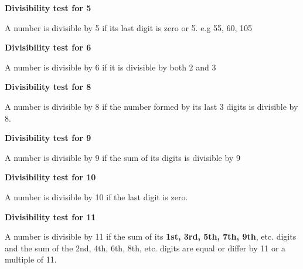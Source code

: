 \documentclass[
  a4paperpaper,
]{scrbook}
\begin{document}
\textbf{Divisibility test for 5}

A number is divisible by 5 if its last digit is zero or 5. e.g 55, 60,
105

\textbf{Divisibility test for 6}

A number is divisible by 6 if it is divisible by both 2 and 3

\textbf{Divisibility test for 8}

A number is divisible by 8 if the number formed by its last 3 digits is
divisible by 8.

\textbf{Divisibility test for 9}

A number is divisible by 9 if the sum of its digits is divisible by 9

\textbf{Divisibility test for 10}

A number is divisible by 10 if the last digit is zero.

\textbf{Divisibility test for 11}

A number is divisible by 11 if the sum of its \textbf{1st, 3rd, 5th,
7th, 9th}, etc. digits and the sum of the 2nd, 4th, 6th, 8th, etc.
digits are equal or differ by 11 or a multiple of 11.
\end{document}
